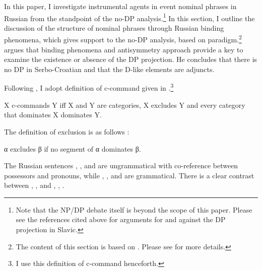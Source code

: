 \documentclass[output=paper,
]{langscibook}
\begin{document}
In this paper, I investigate instrumental agents in event nominal phrases in Russian from the standpoint of the no-DP analysis.\footnote{Note that the NP/DP debate itself is beyond the scope of this paper. Please see the references cited above for arguments for and against the DP projection in Slavic.} 
In this section, I outline the discussion of the structure of nominal phrases through Russian binding phenomena, which gives support to the no-DP analysis, based on  paradigm.\footnote{The content of this section is based on \citet{Miyauchi2016}. Please see \citet{Miyauchi2016} for more details.}  
\citet{Despic2013} argues that binding phenomena and  antisymmetry approach provide a key to examine the existence or absence of the DP projection. He concludes that there is no DP in Serbo-Croatian and that the D-like elements are adjuncts. 

Following \citet{Despic2013}, I adopt  definition of c-command given in .\footnote{I use this definition of c-command henceforth.}

\begin{exe}
\ex\label{def}
X c-commands Y iff X and Y are categories, X excludes Y and every category that 	dominates X dominates Y.	
\hfill \citep[16]{Kayne1994}
\end{exe}

\noindent
The definition of exclusion is as follows :

\begin{exe}
\ex\label{exc} α excludes β if no segment of α dominates β.
\hfill \citep[9]{Chomsky1986}
\end{exe}

\noindent
The Russian sentences , , and  are ungrammatical with co-reference between possessors and pronouns, while , , and  are grammatical. There is a clear contrast between , ,  and , , .

\begin{exe}\ex\label{bin}
\begin{xlist}
\end{xlist}
\end{exe}
\end{document}

